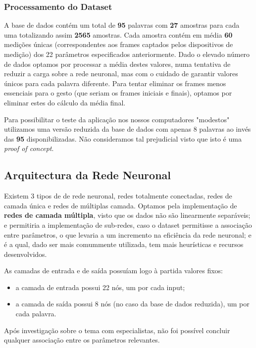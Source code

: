 \documentclass[10pt,a4paper]{article}
\begin{document}
\subsubsection{Processamento do Dataset}

A base de dados contém um total de \textbf{95} palavras com \textbf{27} amostras para cada uma totalizando assim \textbf{2565} amostras.
Cada amostra contém em média \textbf{60} medições únicas (correspondentes aos frames captados pelos dispositivos de medição) dos 22 parâmetros especificados anteriormente.
Dado o elevado número de dados optamos por processar a média destes valores, numa tentativa de reduzir a carga sobre a rede neuronal, mas com o cuidado de garantir valores únicos para cada palavra diferente. Para tentar eliminar os frames menos essenciais para o gesto (que seriam os frames iniciais e finais), optamos por eliminar estes do cálculo da média final.

Para possibilitar o teste da aplicação nos nossos computadores "modestos" utilizamos uma versão reduzida da base de dados com apenas 8 palavras ao invés das \textbf{95} disponibilizadas. Não consideramos tal prejudicial visto que isto é uma \textit{proof of concept}.

\subsection{Arquitectura da Rede Neuronal}

Existem 3 tipos de de rede neuronal, redes totalmente conectadas, redes de camada única e redes de múltiplas camada.
Optamos pela implementação de \textbf{redes de camada múltipla}, visto que os dados não são linearmente separáveis; e permitiria a implementação de sub-redes, caso o dataset permitisse a associação entre parâmetros, o que levaria a um incremento na eficiência da rede neuronal; e é a qual, dado ser mais comummente utilizada, tem mais heurísticas e recursos desenvolvidos.

As camadas de entrada e de saída possuíam logo à partida valores fixos:
\begin{itemize}
\item a camada de entrada possui 22 nós, um por cada input;
\item a camada de saída possui 8 nós (no caso da base de dados reduzida), um por cada palavra.
\end{itemize}

Após investigação sobre o tema com especialistas, não foi possível concluir qualquer associação entre os parâmetros relevantes.
\end{document}
